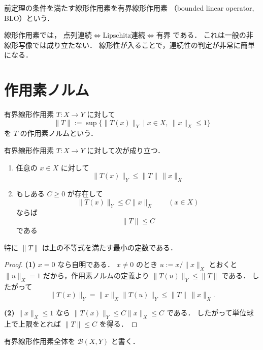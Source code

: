 \begin{definition}[有界線形作用素]
前定理の条件を満たす線形作用素を有界線形作用素
（bounded linear operator, BLO）という．
\end{definition}

\begin{remark}
線形作用素では，
$\text{点列連続} \iff \text{Lipschitz連続} \iff \text{有界}$ である．
これは一般の非線形写像では成り立たない．
線形性が入ることで，連続性の判定が非常に簡単になる．
\end{remark}

\section{作用素ノルム}

\begin{definition}[作用素ノルム]
有界線形作用素 $T:X\to Y$ に対して
\[
\|T\|
:=
\sup\{\|T(x)\|_Y \mid x\in X,\ \|x\|_X\le 1\}
\]
を $T$ の作用素ノルムという．
\end{definition}

\begin{proposition}
有界線形作用素 $T:X\to Y$ に対して次が成り立つ．
\begin{enumerate}
    \item 任意の $x\in X$ に対して
    \[
    \|T(x)\|_Y\le \|T\|\,\|x\|_X
    \]
    \item もしある $C\ge 0$ が存在して
    \[
    \|T(x)\|_Y\le C\|x\|_X
    \qquad (x\in X)
    \]
    ならば
    \[
    \|T\|\le C
    \]
    である
\end{enumerate}
特に $\|T\|$ は上の不等式を満たす最小の定数である．
\end{proposition}
\begin{proof}
\textbf{(1)}\quad
$x=0$ なら自明である．
$x\ne 0$ のとき
$u:=x/\|x\|_X$ とおくと $\|u\|_X=1$ だから，作用素ノルムの定義より
$\|T(u)\|_Y\le \|T\|$ である．
したがって
\[
\|T(x)\|_Y
=
\|x\|_X\|T(u)\|_Y
\le
\|T\|\,\|x\|_X.
\]

\textbf{(2)}\quad
$\|x\|_X\le 1$ なら
$\|T(x)\|_Y\le C\|x\|_X\le C$ である．
したがって単位球上で上限をとれば
$\|T\|\le C$ を得る．
\end{proof}

\begin{definition}
有界線形作用素全体を $\mathcal B(X,Y)$ と書く．
\end{definition}

